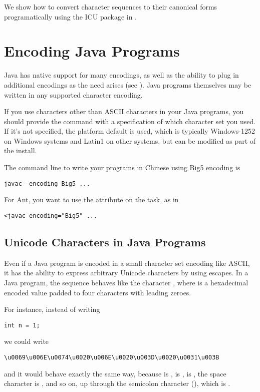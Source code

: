 We show how to convert character sequences to their canonical forms
programatically using the ICU package in .


\section{Encoding Java Programs}

Java has native support for many encodings, as well as the ability to
plug in additional encodings as the need arises (see
).  Java programs themselves may be
written in any supported character encoding.

If you use characters other than ASCII characters in your Java
programs, you should provide the  command with a
specification of which character set you used.  If it's not specified,
the platform default is used, which is typically Windows-1252 on
Windows systems and Latin1 on other systems, but can be modified as
part of the install.  

The command line to write your programs in Chinese using Big5 encoding
is
%
\begin{verbatim}
javac -encoding Big5 ...
\end{verbatim}
%
For Ant, you want to use the  attribute on the
 task, as in
%
\begin{verbatim}
<javac encoding="Big5" ...
\end{verbatim}


\subsection{Unicode Characters in Java Programs}\label{section:char-unicode-java}

Even if a Java program is encoded in a small character set encoding
like ASCII, it has the ability to express arbitrary Unicode characters
by using escapes.  In a Java program, the sequence
  behaves like the character
, where  is a hexadecimal
encoded value padded to four characters with leading zeroes.

For instance, instead of writing

\begin{verbatim}
int n = 1;
\end{verbatim}
%
we could write
%
\begin{verbatim}
\u0069\u006E\u0074\u0020\u006E\u0020\u003D\u0020\u0031\u003B
\end{verbatim}
%
and it would behave exactly the same way, because  is
,  is ,  is
, the space character is , and so on, up
through the semicolon character (\charmention{;}), which is
.

